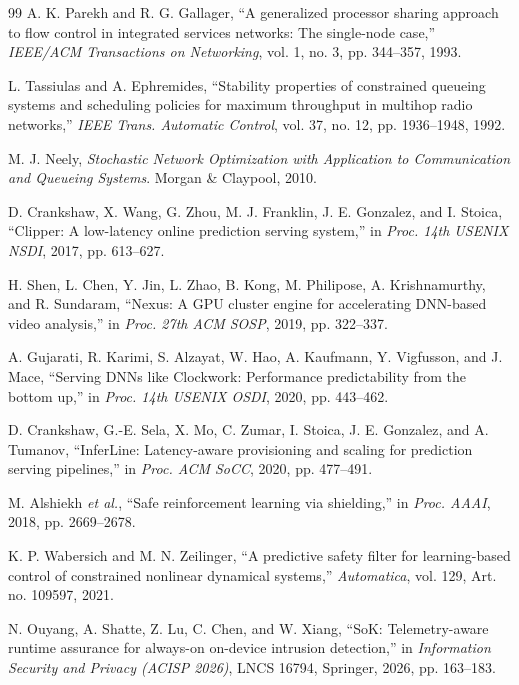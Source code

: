 \documentclass[10pt,journal]{IEEEtran}
\begin{document}
\begin{thebibliography}{99}
A. K. Parekh and R. G. Gallager,
``A generalized processor sharing approach to flow control in integrated
services networks: The single-node case,''
\emph{IEEE/ACM Transactions on Networking},
vol. 1, no. 3, pp. 344--357, 1993.

L. Tassiulas and A. Ephremides,
``Stability properties of constrained queueing systems and scheduling
policies for maximum throughput in multihop radio networks,''
\emph{IEEE Trans. Automatic Control},
vol. 37, no. 12, pp. 1936--1948, 1992.

M. J. Neely,
\emph{Stochastic Network Optimization with Application to Communication
and Queueing Systems}.
Morgan \& Claypool, 2010.

D. Crankshaw, X. Wang, G. Zhou, M. J. Franklin,
J. E. Gonzalez, and I. Stoica,
``Clipper: A low-latency online prediction serving system,''
in \emph{Proc. 14th USENIX NSDI}, 2017, pp. 613--627.

H. Shen, L. Chen, Y. Jin, L. Zhao, B. Kong, M. Philipose,
A. Krishnamurthy, and R. Sundaram,
``Nexus: A GPU cluster engine for accelerating DNN-based video
analysis,''
in \emph{Proc. 27th ACM SOSP}, 2019, pp. 322--337.

A. Gujarati, R. Karimi, S. Alzayat, W. Hao, A. Kaufmann,
Y. Vigfusson, and J. Mace,
``Serving DNNs like Clockwork: Performance predictability from the
bottom up,''
in \emph{Proc. 14th USENIX OSDI}, 2020, pp. 443--462.

D. Crankshaw, G.-E. Sela, X. Mo, C. Zumar, I. Stoica,
J. E. Gonzalez, and A. Tumanov,
``InferLine: Latency-aware provisioning and scaling for prediction
serving pipelines,''
in \emph{Proc. ACM SoCC}, 2020, pp. 477--491.

M. Alshiekh \emph{et al.},
``Safe reinforcement learning via shielding,''
in \emph{Proc. AAAI}, 2018, pp. 2669--2678.

K. P. Wabersich and M. N. Zeilinger,
``A predictive safety filter for learning-based control of constrained
nonlinear dynamical systems,''
\emph{Automatica}, vol. 129, Art. no. 109597, 2021.

N. Ouyang, A. Shatte, Z. Lu, C. Chen, and W. Xiang,
``SoK: Telemetry-aware runtime assurance for always-on on-device
intrusion detection,''
in \emph{Information Security and Privacy (ACISP 2026)},
LNCS 16794, Springer, 2026, pp. 163--183.


\end{thebibliography}
\end{document}
